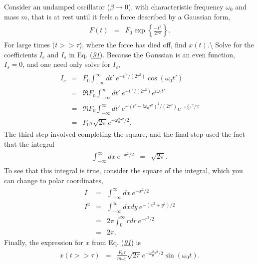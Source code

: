 \documentclass[letterpaper,10pt,english]{sphinxmanual}
\begin{document}
Consider an undamped oscillator (\(\beta\rightarrow 0\)), with
characteristic frequency \(\omega_0\) and mass \(m\), that is at rest
until it feels a force described by a Gaussian form,
\begin{equation*}
\begin{split}
\begin{eqnarray*}
F(t)&=&F_0 \exp\left\{\frac{-t^2}{2\tau^2}\right\}.
\end{eqnarray*}
\end{split}
\end{equation*}
For large times (\(t>>\tau\)), where the force has died off, find
\(x(t)\).\textbackslash{} Solve for the coefficients \(I_c\) and \(I_s\) in
Eq. ({\hyperref[\detokenize{chapter1:eq:Greeny2}]{\emph{91}}}). Because the Gaussian is an even function,
\(I_s=0\), and one need only solve for \(I_c\),
\begin{equation*}
\begin{split}
\begin{eqnarray*}
I_c&=&F_0\int_{-\infty}^\infty dt'~e^{-t^{\prime 2}/(2\tau^2)}\cos(\omega_0 t')\\
&=&\Re F_0 \int_{-\infty}^\infty dt'~e^{-t^{\prime 2}/(2\tau^2)}e^{i\omega_0 t'}\\
&=&\Re F_0 \int_{-\infty}^\infty dt'~e^{-(t'-i\omega_0\tau^2)^2/(2\tau^2)}e^{-\omega_0^2\tau^2/2}\\
&=&F_0\tau \sqrt{2\pi} e^{-\omega_0^2\tau^2/2}.
\end{eqnarray*}
\end{split}
\end{equation*}
The third step involved completing the square, and the final step used the fact that the integral
\begin{equation*}
\begin{split}
\begin{eqnarray*}
\int_{-\infty}^\infty dx~e^{-x^2/2}&=&\sqrt{2\pi}.
\end{eqnarray*}
\end{split}
\end{equation*}
To see that this integral is true, consider the square of the integral, which you can change to polar coordinates,
\begin{equation*}
\begin{split}
\begin{eqnarray*}
I&=&\int_{-\infty}^\infty dx~e^{-x^2/2}\\
I^2&=&\int_{-\infty}^\infty dxdy~e^{-(x^2+y^2)/2}\\
&=&2\pi\int_0^\infty rdr~e^{-r^2/2}\\
&=&2\pi.
\end{eqnarray*}
\end{split}
\end{equation*}
Finally, the expression for \(x\) from Eq. ({\hyperref[\detokenize{chapter1:eq:Greeny2}]{\emph{91}}}) is
\begin{equation*}
\begin{split}
\begin{eqnarray*}
x(t>>\tau)&=&\frac{F_0\tau}{m\omega_0} \sqrt{2\pi} e^{-\omega_0^2\tau^2/2}\sin(\omega_0t).
\end{eqnarray*}
\end{split}
\end{equation*}
\end{document}
